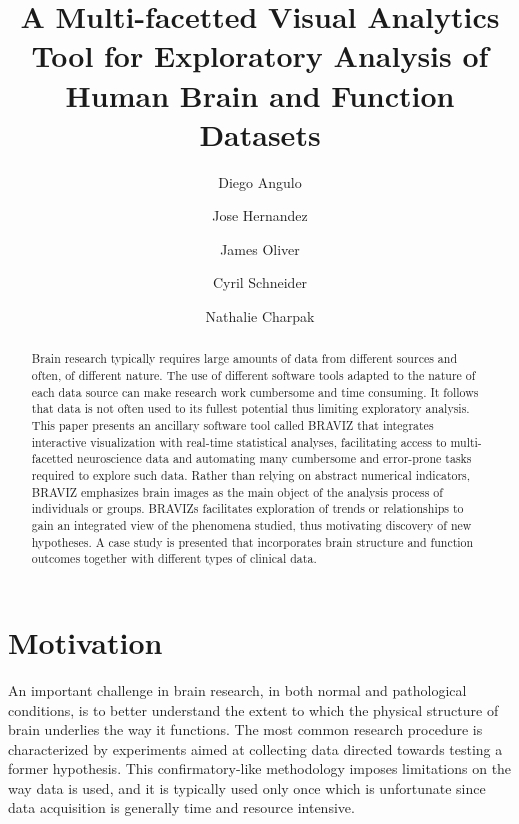 \documentclass[twocolumn]{svjour3}
\begin{document}
\title{A Multi-facetted Visual Analytics Tool for Exploratory Analysis of Human Brain and Function Datasets} 

\author{Diego Angulo \and Jose Hernandez \and James Oliver \and Cyril Schneider \and Nathalie Charpak}



\maketitle


\begin{abstract}
Brain research typically requires large amounts of data from different sources and often, of different nature. The use of different software tools adapted to the nature of each data source can make research work cumbersome and time consuming. It follows that data is not often used to its fullest potential thus limiting exploratory analysis. This paper presents an ancillary software tool called BRAVIZ that integrates interactive visualization with real-time statistical analyses, facilitating access to multi-facetted neuroscience data and automating many cumbersome and error-prone tasks required to explore such data. Rather than relying on abstract numerical indicators, BRAVIZ emphasizes brain images as the main object of the analysis process of individuals or groups. BRAVIZs facilitates exploration of trends or relationships to gain an integrated view of the phenomena studied, thus motivating discovery of new hypotheses. A case study is presented that incorporates brain structure and function outcomes together with different types of clinical data.

\end{abstract}

\section{Motivation}


An important challenge in brain research, in both normal and pathological conditions, is to better understand the extent to which the physical structure of brain underlies the way it functions. The most common research procedure is characterized by experiments aimed at collecting data directed towards testing a former hypothesis. This confirmatory-like methodology imposes limitations on the way data is used, and it is typically used only once which is unfortunate since data acquisition is generally time and resource intensive.
\end{document}
